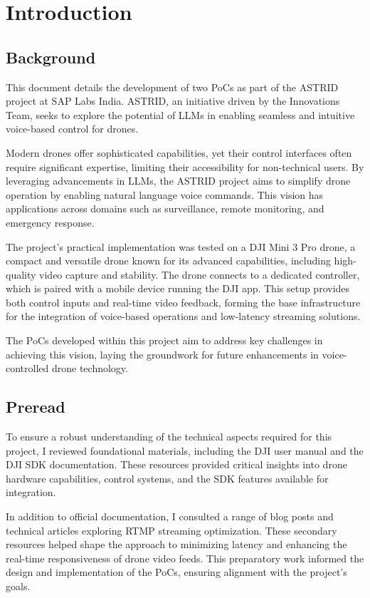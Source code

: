 \chapter{Introduction}
\label{introduction}
\nocite{*}

\section{Background}
This document details the development of two \acp{PoC} as part of the \ac{ASTRID} project at SAP Labs India. \ac{ASTRID}, an initiative driven by the Innovations Team, 
seeks to explore the potential of \acp{LLM} in enabling seamless and intuitive voice-based control for drones. 

Modern drones offer sophisticated capabilities, yet their control interfaces often require significant expertise, limiting their accessibility for non-technical users. 
By leveraging advancements in \acp{LLM}, the \ac{ASTRID} project aims to simplify drone operation by enabling natural language voice commands. This vision has applications across domains such as surveillance, remote monitoring, and emergency response.

The project's practical implementation was tested on a DJI Mini 3 Pro drone, a compact and versatile drone known for its advanced capabilities, including high-quality video capture and stability. 
The drone connects to a dedicated controller, which is paired with a mobile device running the DJI app. This setup provides both control inputs and real-time video feedback, forming the base infrastructure for the integration of voice-based operations and low-latency streaming solutions.

The \acp{PoC} developed within this project aim to address key challenges in achieving this vision, laying the groundwork for future enhancements in voice-controlled drone technology.

\section{Preread}
To ensure a robust understanding of the technical aspects required for this project, I reviewed foundational materials, including the DJI user manual and the DJI SDK documentation. 
These resources provided critical insights into drone hardware capabilities, control systems, and the SDK features available for integration. 

In addition to official documentation, I consulted a range of blog posts and technical articles exploring \ac{RTMP} streaming optimization. 
These secondary resources helped shape the approach to minimizing latency and enhancing the real-time responsiveness of drone video feeds. 
This preparatory work informed the design and implementation of the \acp{PoC}, ensuring alignment with the project's goals.
